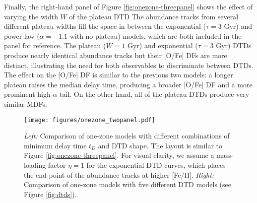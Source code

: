 \documentclass[twocolumn,twocolappendix,linenumbers]{aastex631}
\begin{document}
Finally, the right-hand panel of Figure \ref{fig:onezone-threepanel} shows the effect of varying the width $W$ of the plateau DTD 
The abundance tracks from several different plateau widths fill the space in between the exponential ($\tau=3$ Gyr) and power-law ($\alpha=-1.1$ with no plateau) models, which are both included in the panel for reference. 
The plateau ($W=1$ Gyr) and exponential ($\tau=3$ Gyr) DTDs produce nearly identical abundance tracks but their [O/Fe] DFs are more distinct, illustrating the need for both observables to discriminate between DTDs.
The effect on the [O/Fe] DF is similar to the previous two models: a longer plateau raises the median delay time, producing a broader [O/Fe] DF and a more prominent high-$\alpha$ tail. On the other hand, all of the plateau DTDs produce very similar MDFs.

\begin{figure*}
    \centering
    \texttt{[image: figures/onezone\_twopanel.pdf]}
    \caption{\textit{Left:} Comparison of one-zone models with different combinations of minimum delay time $t_D$ and DTD shape.
    The layout is similar to Figure \ref{fig:onezone-threepanel}. For visual clarity, we assume a mass-loading factor $\eta=1$ for the exponential DTD curves, which places the end-point of the abundance tracks at higher [Fe/H].
    \textit{Right:} Comparison of one-zone models with five different DTD models (see Figure \ref{fig:dtds}).
    }
    \label{fig:onezone-twopanel}
\end{figure*}
\end{document}

